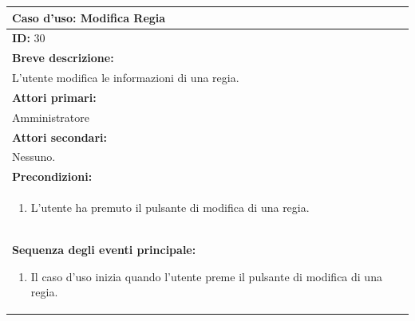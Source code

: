 \documentclass{article}
\begin{document}
                \begin{table}[H]
                    \begin{tabular}{|p{\linewidth}|}
                        \hline
                        \cellcolor{gray!100}
                        \color{white}
                        \centerline{\textbf{Caso d'uso:} Modifica Regia} \\
                        \hline
                        \textbf{ID:} 30 \\
                        \hline
                        \cellcolor{gray!20}
                        \textbf{Breve descrizione:} \\
                        \cellcolor{gray!20}
                        L'utente modifica le informazioni di una regia. \\
                        \hline
                        \textbf{Attori primari:} \\
                        \begin{minipage}{\linewidth}
                            Amministratore
                        \end{minipage}
                        \vspace{-10pt} \\ %
                        \hline
                        \textbf{Attori secondari:} \\
                        Nessuno. \\
                        \hline
                        \cellcolor{gray!20}
                        \textbf{Precondizioni:} \\
                        \cellcolor{gray!20}
                        \begin{minipage}{\linewidth}
                            \begin{enumerate}
                                \item L'utente ha premuto il pulsante di modifica di una regia.
                            \end{enumerate}
                        \end{minipage} \\
                        \hline
                        \textbf{Sequenza degli eventi principale:}
                        \begin{enumerate}
                            \item Il caso d'uso inizia quando l'utente preme il pulsante di modifica di una regia.

\end{enumerate}
\end{tabular}
\end{table}
\end{document}
